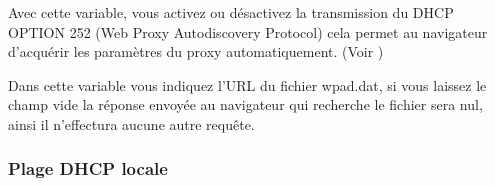 \begin{description}
     
     {Avec cette variable, vous activez ou désactivez la transmission du DHCP OPTION 252
	 (Web Proxy Autodiscovery Protocol) cela permet au navigateur d'acquérir les paramètres
	 du proxy automatiquement.
	 (Voir )
     }
     
     
     {Dans cette variable vous indiquez l'URL du fichier wpad.dat, si vous laissez le champ
	 vide la réponse envoyée au navigateur qui recherche le fichier sera nul, ainsi il
	 n'effectura aucune autre requête.
     }

\end{description}


\subsubsection{Plage DHCP locale}

